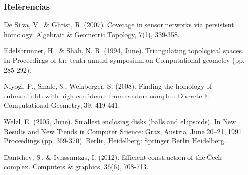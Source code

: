 \documentclass{beamer}
\begin{document}
\begin{frame}\frametitle{Referencias}
  
\begin{thebibliography}{9}
De Silva, V., \& Ghrist, R. (2007). Coverage in sensor networks via persistent homology. Algebraic \& Geometric Topology, 7(1), 339-358.

Edelsbrunner, H., \& Shah, N. R. (1994, June). Triangulating topological spaces. In Proceedings of the tenth annual symposium on Computational geometry (pp. 285-292).

Niyogi, P., Smale, S., Weinberger, S. (2008). Finding the homology of submanifolds with high confidence from random samples. Discrete \& Computational Geometry, 39, 419-441.

Welzl, E. (2005, June). Smallest enclosing disks (balls and ellipsoids). In New Results and New Trends in Computer Science: Graz, Austria, June 20–21, 1991 Proceedings (pp. 359-370). Berlin, Heidelberg: Springer Berlin Heidelberg.

Dantchev, S., \& Ivrissimtzis, I. (2012). Efficient construction of the Čech complex. Computers \& graphics, 36(6), 708-713.
\end{thebibliography}
\end{frame}
\end{document}

